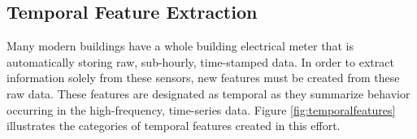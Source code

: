 \subsection{Temporal Feature Extraction}
Many modern buildings have a whole building electrical meter that is automatically storing raw, sub-hourly, time-stamped data. In order to extract information solely from these sensors, new features must be created from these raw data.  These features are designated as temporal as they summarize behavior occurring in the high-frequency, time-series data. Figure \ref{fig:temporalfeatures} illustrates the categories of temporal features created in this effort.
